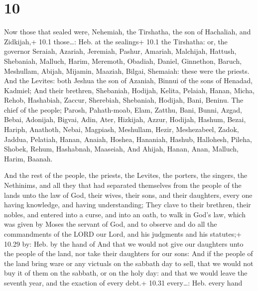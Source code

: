 \hypertarget{section-9}{%
\section{10}\label{section-9}}

 Now those that sealed were, Nehemiah, the Tirshatha, the
son of Hachaliah, and Zidkijah,+ 10.1 those\ldots: Heb. at the sealings+
10.1 the Tirshatha: or, the governor  Seraiah, Azariah,
Jeremiah,  Pashur, Amariah, Malchijah,  Hattush,
Shebaniah, Malluch,  Harim, Meremoth, Obadiah, 
Daniel, Ginnethon, Baruch,  Meshullam, Abijah, Mijamin,
 Maaziah, Bilgai, Shemaiah: these were the priests.
 And the Levites: both Jeshua the son of Azaniah, Binnui of
the sons of Henadad, Kadmiel;  And their brethren,
Shebaniah, Hodijah, Kelita, Pelaiah, Hanan,  Micha, Rehob,
Hashabiah,  Zaccur, Sherebiah, Shebaniah, 
Hodijah, Bani, Beninu.  The chief of the people; Parosh,
Pahath-moab, Elam, Zatthu, Bani,  Bunni, Azgad, Bebai,
 Adonijah, Bigvai, Adin,  Ater, Hizkijah,
Azzur,  Hodijah, Hashum, Bezai,  Hariph,
Anathoth, Nebai,  Magpiash, Meshullam, Hezir, 
Meshezabeel, Zadok, Jaddua,  Pelatiah, Hanan, Anaiah,
 Hoshea, Hananiah, Hashub,  Hallohesh, Pileha,
Shobek,  Rehum, Hashabnah, Maaseiah,  And
Ahijah, Hanan, Anan,  Malluch, Harim, Baanah.

 And the rest of the people, the priests, the Levites,
the porters, the singers, the Nethinims, and all they that had separated
themselves from the people of the lands unto the law of God, their
wives, their sons, and their daughters, every one having knowledge, and
having understanding;  They clave to their brethren, their
nobles, and entered into a curse, and into an oath, to walk in God's
law, which was given by Moses the servant of God, and to observe and do
all the commandments of the LORD our Lord, and his judgments and his
statutes;+ 10.29 by: Heb. by the hand of  And that we would
not give our daughters unto the people of the land, nor take their
daughters for our sons:  And if the people of the land
bring ware or any victuals on the sabbath day to sell, that we would not
buy it of them on the sabbath, or on the holy day: and that we would
leave the seventh year, and the exaction of every debt.+ 10.31
every\ldots: Heb. every hand

